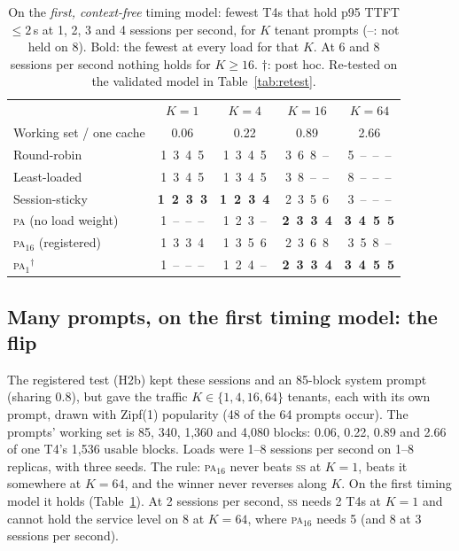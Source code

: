\documentclass[10pt,twocolumn]{article}
\newcommand{\PA}{\textsc{pa}}
\newcommand{\SSt}{\textsc{ss}}
\newcommand{\miss}{--}
\begin{document}
\begin{table}[t]
\centering\small
\caption{On the \emph{first, context-free} timing model: fewest T4s that hold p95 TTFT $\le 2$\,s at
1, 2, 3 and 4 sessions per second, for $K$ tenant prompts (\miss: not held on 8). Bold: the fewest at
every load for that $K$. At 6 and 8 sessions per second nothing holds for $K \ge 16$. $\dagger$: post
hoc. Re-tested on the validated model in Table~\ref{tab:retest}.}
\label{tab:flip}
\begin{tabular}{@{}lcccc@{}}
\toprule
& $K = 1$ & $K = 4$ & $K = 16$ & $K = 64$ \\
Working set / one cache & 0.06 & 0.22 & 0.89 & 2.66 \\
\midrule
Round-robin            & 1\ 3\ 4\ 5 & 1\ 3\ 4\ 5 & 3\ 6\ 8\ \miss & 5\ \miss\ \miss\ \miss \\
Least-loaded           & 1\ 3\ 4\ 5 & 1\ 3\ 4\ 5 & 3\ 8\ \miss\ \miss & 8\ \miss\ \miss\ \miss \\
Session-sticky         & \textbf{1\ 2\ 3\ 3} & \textbf{1\ 2\ 3\ 4} & 2\ 3\ 5\ 6 & 3\ \miss\ \miss\ \miss \\
\PA{} (no load weight) & 1\ \miss\ \miss\ \miss & 1\ 2\ 3\ \miss & \textbf{2\ 3\ 3\ 4} & \textbf{3\ 4\ 5\ 5} \\
\PA$_{16}$ (registered) & 1\ 3\ 3\ 4 & 1\ 3\ 5\ 6 & 2\ 3\ 6\ 8 & 3\ 5\ 8\ \miss \\
\PA$_{1}{}^{\dagger}$  & 1\ \miss\ \miss\ \miss & 1\ 2\ 4\ \miss & \textbf{2\ 3\ 3\ 4} & \textbf{3\ 4\ 5\ 5} \\
\bottomrule
\end{tabular}
\end{table}

\subsection{Many prompts, on the first timing model: the flip}\label{sec:finding}

The registered test (H2b) kept these sessions and an 85-block system prompt (sharing 0.8), but gave
the traffic $K \in \{1, 4, 16, 64\}$ tenants, each with its own prompt, drawn with Zipf(1) popularity
(48 of the 64 prompts occur). The prompts' working set is 85, 340, 1{,}360 and 4{,}080 blocks: 0.06,
0.22, 0.89 and 2.66 of one T4's 1{,}536 usable blocks. Loads were 1--8 sessions per second on 1--8
replicas, with three seeds. The rule: \PA$_{16}$ never beats \SSt{} at $K = 1$, beats it somewhere at
$K = 64$, and the winner never reverses along $K$. On the first timing model it holds
(Table~\ref{tab:flip}). At 2 sessions per second, \SSt{} needs 2 T4s at $K = 1$ and cannot hold the
service level on 8 at $K = 64$, where \PA$_{16}$ needs 5 (and 8 at 3 sessions per second).
\end{document}
